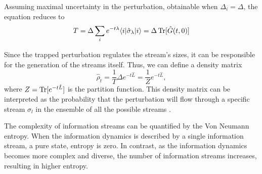 Assuming maximal uncertainty in the perturbation, obtainable when $\Delta_i = \Delta$, the equation reduces to
\begin{equation}
    T = \Delta \sum_i e^{-t\lambda} \langle i\rvert  \hat \sigma_\lambda \lvert i\rangle = \Delta \operatorname{Tr} [\hat G(t,0)]
\end{equation}

Since the trapped perturbation regulates the stream's sizes, it can be responsible for the generation of the streams itself. 
Thus, we can define a density matrix 
\begin{equation}
    \hat \rho_t = \frac{1}{T} \Delta e^{-t\hat L} =  \frac{1}{Z} e^{-t\hat L},
\end{equation}
where $Z = \operatorname{Tr}[e^{-t\hat L}] $ is the partition function.
This density matrix can be interpreted as the probability that the perturbation will flow through a specific stream $\hat \sigma_l$ in the ensemble of all the possible streams \cite{De_Domenico_2020}.

The complexity of information streams can be quantified by the Von Neumann entropy.
When the information dynamics is described by a single information stream, a pure state, entropy is zero.
In contrast, as the information dynamics becomes more complex and diverse, the number of information streams increases, resulting in higher entropy.

